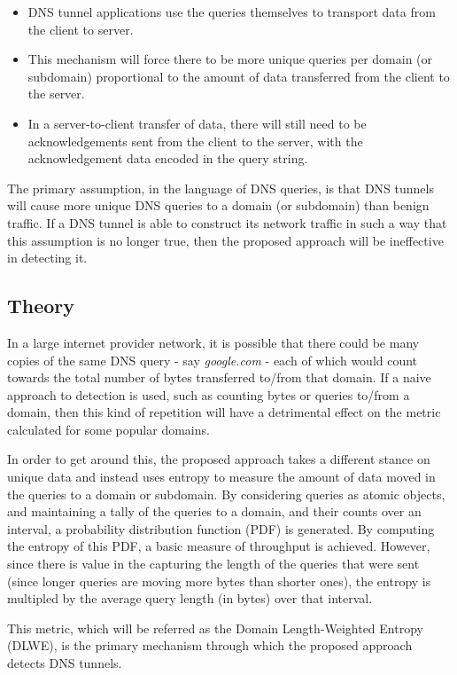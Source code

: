 \documentclass[12pt]{report}
\theoremstyle{remark}
\theoremstyle{definition}
\theoremstyle{definition}
\theoremstyle{definition}
\begin{document}
\begin{itemize}
\item DNS tunnel applications use the queries themselves to transport data from
the client to server.
\item This mechanism will force there to be more unique
queries per domain (or subdomain) proportional to the amount of data transferred
from the client to the server.
\item In a server-to-client transfer of data, there will still need to be
acknowledgements sent from the client to the server, with the acknowledgement
data encoded in the query string.
\end{itemize}

The primary assumption, in the language of DNS queries, is that DNS tunnels will
cause more unique DNS queries to a domain (or subdomain) than benign traffic. If
a DNS tunnel is able to construct its network traffic in such a way that this
assumption is no longer true, then the proposed approach will be ineffective in
detecting it.

\subsection{Theory}
In a large internet provider network, it is possible that there could be many
copies of the same DNS query - say \emph{google.com} - each of which would count
towards the total number of bytes transferred to/from that domain. If a naive
approach to detection is used, such as counting bytes or queries to/from a
domain, then this kind of repetition will have a detrimental effect on the
metric calculated for some popular domains.

In order to get around this, the proposed approach takes a different stance on
unique data and instead uses entropy to measure the amount of data moved in the
queries to a domain or subdomain. By considering queries as atomic objects, and
maintaining a tally of the queries to a domain, and their counts over an
interval, a probability distribution function (PDF) is generated. By computing
the entropy of this PDF, a basic measure of throughput is achieved. However,
since there is value in the capturing the length of the queries that were sent
(since longer queries are moving more bytes than shorter ones), the entropy is
multipled by the average query length (in bytes) over that interval.

This metric, which will be referred as the Domain Length-Weighted Entropy
(DLWE), is the primary mechanism through which the proposed approach detects DNS
tunnels.
\end{document}
